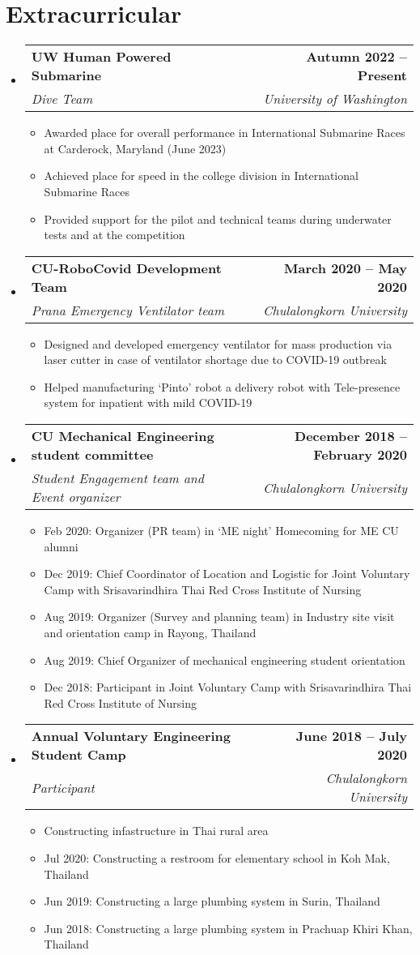\documentclass[letterpaper,11pt]{article}
\makeatletter
\newcommand{\resumeItem}[1]{
  \item\small{
    {#1 \vspace{-2pt}}
  }
}
\newcommand{\resumeSubheading}[4]{
  \vspace{-2pt}\item
    \begin{tabular*}{1.0\textwidth}[t]{l@{\extracolsep{\fill}}r}
      \textbf{#1} & \textbf{\small #2} \\
      \textit{\small#3} & \textit{\small #4} \\
    \end{tabular*}\vspace{-7pt}
}
\newcommand{\resumeSubHeadingListStart}{\begin{itemize}[leftmargin=0.0in, label={}]}
\newcommand{\resumeSubHeadingListEnd}{\end{itemize}}
\newcommand{\resumeItemListStart}{\begin{itemize}}
\newcommand{\resumeItemListEnd}{\end{itemize}\vspace{-5pt}}
\makeatother
\begin{document}
\section{Extracurricular}
    \resumeSubHeadingListStart
        \resumeSubheading{UW Human Powered Submarine}{Autumn 2022 -- Present}{Dive Team}{University of Washington}
            \resumeItemListStart
                \resumeItem{Awarded  place for overall performance in \nth{17} International Submarine Races at Carderock, Maryland (June 2023)}
                \resumeItem{Achieved  place for speed in the college division in \nth{17} International Submarine Races}
                \resumeItem{Provided support for the pilot and technical teams during underwater tests and at the competition}
            \resumeItemListEnd
            \resumeSubheading{CU-RoboCovid Development Team}{March 2020 -- May 2020}{Prana Emergency Ventilator team}{Chulalongkorn University}
                \resumeItemListStart
                    \resumeItem{Designed and developed emergency ventilator for mass production via laser cutter in case of ventilator shortage due to COVID-19 outbreak}
                    \resumeItem{Helped manufacturing `Pinto' robot a delivery robot with Tele-presence system for inpatient with mild COVID-19}
                \resumeItemListEnd
            \resumeSubheading{CU Mechanical Engineering student committee}{December 2018 -- February 2020}{Student Engagement team and Event organizer}{Chulalongkorn University}
            \resumeItemListStart
                \resumeItem{Feb 2020: Organizer (PR team) in `ME night'  Homecoming for ME CU alumni}
                \resumeItem{Dec 2019: Chief Coordinator of Location and Logistic for \nth{2} Joint Voluntary Camp with Srisavarindhira Thai Red Cross Institute of Nursing}
                \resumeItem{Aug 2019: Organizer (Survey and planning team) in Industry site visit and orientation camp in Rayong, Thailand}
                \resumeItem{Aug 2019: Chief Organizer of mechanical engineering student orientation}
                \resumeItem{Dec 2018: Participant in  Joint Voluntary Camp with Srisavarindhira Thai Red Cross Institute of Nursing}
            \resumeItemListEnd
            \resumeSubheading{Annual Voluntary Engineering Student Camp}{June 2018 -- July 2020}{Participant}{Chulalongkorn University}
                \resumeItemListStart
                    \resumeItem{Constructing infastructure in Thai rural area}
                    \resumeItem{Jul 2020: Constructing a restroom for elementary school in Koh Mak, Thailand}
                    \resumeItem{Jun 2019: Constructing a large plumbing system in Surin, Thailand}
                    \resumeItem{Jun 2018: Constructing a large plumbing system in Prachuap Khiri Khan, Thailand}
                \resumeItemListEnd
        
    \resumeSubHeadingListEnd
\end{document}
